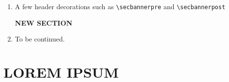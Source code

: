 \documentclass[9pt,a4paper]{extarticle}
\begin{document}
\begin{enumerate}
\item A few header decorations such as \verb"\secbannerpre" and \verb"\secbannerpost"
    \begin{center}
        \Large\heavierfont\bfseries{}
        \secbannerpre{}
        NEW SECTION
        \secbannerpost{}
    \end{center}

\item To be continued.

\end{enumerate}

\section{LOREM IPSUM}
\lipsum[1-8]
\end{document}

